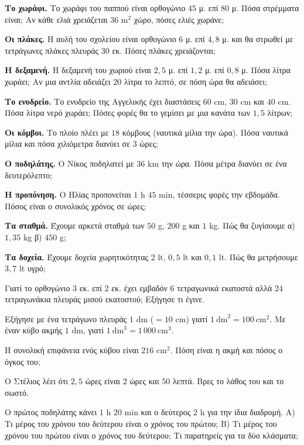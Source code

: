 
\ex \textbf{Το χωράφι.} Το χωράφι του παππού είναι ορθογώνιο $45$ μ. επί $80$ μ. Πόσα στρέμματα είναι; Αν κάθε ελιά χρειάζεται $36$ m$^2$ χώρο, πόσες ελιές χωράνε;

\ex \textbf{Οι πλάκες.} Η αυλή του σχολείου είναι ορθογώνιο $6$ μ. επί $4{,}8$ μ. και θα στρωθεί με τετράγωνες πλάκες πλευράς $30$ εκ. Πόσες πλάκες χρειάζονται;

\ex \textbf{Η δεξαμενή.} Η δεξαμενή του χωριού είναι $2{,}5$ μ. επί $1{,}2$ μ. επί $0{,}8$ μ. Πόσα λίτρα χωράει; Αν μια αντλία αδειάζει $20$ λίτρα το λεπτό, σε πόση ώρα θα αδειάσει;

\ex \textbf{Το ενυδρείο.} Το ενυδρείο της Αγγελικής έχει διαστάσεις $60$ cm, $30$ cm και $40$ cm. Πόσα λίτρα νερό χωράει; Πόσες φορές θα το γεμίσει με μια κανάτα των $1{,}5$ λίτρων;

\ex \textbf{Οι κόμβοι.} Το πλοίο πλέει με $18$ κόμβους (ναυτικά μίλια την ώρα). Πόσα ναυτικά μίλια και πόσα χιλιόμετρα διανύει σε $3$ ώρες;

\ex \textbf{Ο ποδηλάτης.} Ο Νίκος ποδηλατεί με $36$ km την ώρα. Πόσα μέτρα διανύει σε ένα δευτερόλεπτο;

\ex \textbf{Η προπόνηση.} Ο Ηλίας προπονείται $1$ h $45$ min, τέσσερις φορές την εβδομάδα. Πόσος είναι ο συνολικός χρόνος σε ώρες;

\ex \textbf{Τα σταθμά.} Έχουμε αρκετά σταθμά των $50$ g, $200$ g και $1$ kg. Πώς θα ζυγίσουμε α) $1{,}35$ kg \quad β) $450$ g;

\ex \textbf{Τα δοχεία.} Έχουμε δοχεία χωρητικότητας $2$ lt, $0{,}5$ lt και $0{,}1$ lt. Πώς θα μετρήσουμε $3{,}7$ lt υγρό;


\ex Γιατί το ορθογώνιο $3$ εκ. επί $2$ εκ. έχει εμβαδόν $6$ τετραγωνικά εκατοστά αλλά $24$ τετραγωνάκια πλευράς μισού εκατοστού; Εξήγησε τι έγινε.

\ex Εξήγησε με ένα τετράγωνο πλευράς $1$ dm ($=10$ cm) γιατί $1\ \mathrm{dm}^2=100\ \mathrm{cm}^2$. Με έναν κύβο ακμής $1$ dm, γιατί $1\ \mathrm{dm}^3=1\,000\ \mathrm{cm}^3$.

\ex Η συνολική επιφάνεια ενός κύβου είναι $216$ cm$^2$. Πόση είναι η ακμή και πόσος ο όγκος του;

\ex Ο Στέλιος λέει ότι $2{,}5$ ώρες είναι $2$ ώρες και $50$ λεπτά. Βρες το λάθος του και το σωστό.

\ex Ο πρώτος ποδηλάτης κάνει $1$ h $20$ min και ο δεύτερος $2$ h για την ίδια διαδρομή. Α) Τι μέρος του χρόνου του δεύτερου είναι ο χρόνος του πρώτου; Β) Τι μέρος του χρόνου του πρώτου είναι ο χρόνος του δεύτερου; Τι παρατηρείς για τα δύο κλάσματα;

